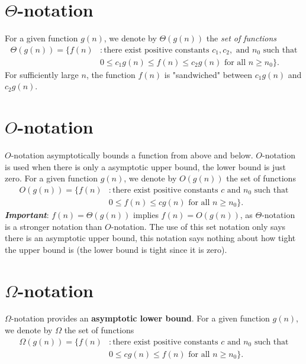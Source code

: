 \documentclass[12pt]{article}
\begin{document}
\newpage
\section*{$\Theta$-notation}
For a given function $g(n)$, we denote by $\Theta{(g(n))}$ the \textit{set of functions}\newline
\begin{equation*}
\begin{split}
\Theta{(g(n))} = \{f(n) & : \text{there exist positive constants } c_1, c_2, \text{ and } n_0 \text{ such that}\\
  & 0 \leq c_1g(n) \leq f(n) \leq c_2g(n) \text{ for all } n \geq n_0\}.
\end{split}
\end{equation*}
For sufficiently large $n$, the function $f(n)$ is "sandwiched" between $c_1g(n)$ and $c_2g(n)$.


\section*{$O$-notation}
$O$-notation asymptotically bounds a function from above and below. $O$-notation is used when there is only a asymptotic upper bound, the lower bound is just zero. \newline
For a given function $g(n)$, we denote by $O{(g(n))}$ the set of functions\newline
\begin{equation*}
\begin{split}
O{(g(n))} = \{f(n) & : \text{there exist positive constants } c\text{ and } n_0 \text{ such that}\\
  & 0 \leq f(n) \leq cg(n) \text{ for all } n \geq n_0\}.
\end{split}
\end{equation*}
\textbf{\emph{Important}}: $f(n)=\Theta{(g(n))}$ implies $f(n)=O{(g(n))}$, as $\Theta$-notation is a stronger notation than $O$-notation. The use of this set notation only says there is an asymptotic upper bound, this notation says nothing about how tight the upper bound is (the lower bound is tight since it is zero).


\section*{$\Omega$-notation}
$\Omega$-notation provides an \textbf{asymptotic lower bound}.\newline
For a given function $g(n)$, we denote by $\Omega$ the set of functions\newline
\begin{equation*}
\begin{split}
\Omega{(g(n))} = \{f(n) & : \text{there exist positive constants } c\text{ and } n_0 \text{ such that}\\
  & 0 \leq cg(n) \leq f(n) \text{ for all } n \geq n_0\}.
\end{split}
\end{equation*}
\end{document}
